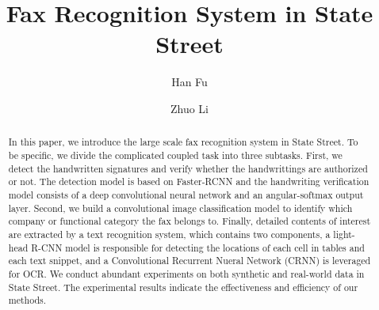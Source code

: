 \documentclass[sigconf]{acmart}
\begin{document}
%
\title{Fax Recognition System in State Street}

%
\author{Han Fu}

\author{Zhuo Li}
%

%
\begin{abstract}
In this paper, we introduce the large scale fax recognition system in State Street. To be specific, we divide the complicated coupled task into three subtasks. First, we detect the handwritten signatures and verify whether the handwrittings are authorized or not. The detection model is based on Faster-RCNN and the handwriting verification model consists of a deep convolutional neural network and an angular-softmax output layer. Second, we build a convolutional image classification model to identify which company or functional category the fax belongs to. Finally, detailed contents of interest are extracted by a text recognition system, which contains two components, a light-head R-CNN model is responsible for detecting the locations of each cell in tables and each text snippet, and a Convolutional Recurrent Nueral Network (CRNN) is leveraged for OCR. We conduct abundant experiments on both synthetic and real-world data in State Street. The experimental results indicate the effectiveness and efficiency of our methods.

\end{abstract}

%
%

%
\end{document}
